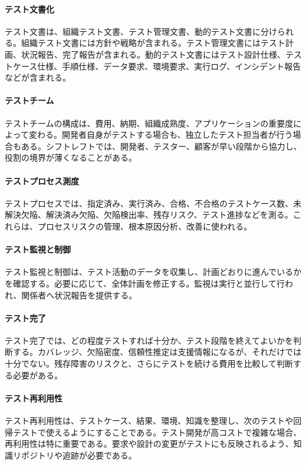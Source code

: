 \paragraph{テスト文書化}
テスト文書は、組織テスト文書、テスト管理文書、動的テスト文書に分けられる。組織テスト文書には方針や戦略が含まれる。テスト管理文書にはテスト計画、状況報告、完了報告が含まれる。動的テスト文書にはテスト設計仕様、テストケース仕様、手順仕様、データ要求、環境要求、実行ログ、インシデント報告などが含まれる。

\paragraph{テストチーム}
テストチームの構成は、費用、納期、組織成熟度、アプリケーションの重要度によって変わる。開発者自身がテストする場合も、独立したテスト担当者が行う場合もある。シフトレフトでは、開発者、テスター、顧客が早い段階から協力し、役割の境界が薄くなることがある。

\paragraph{テストプロセス測度}
テストプロセスでは、指定済み、実行済み、合格、不合格のテストケース数、未解決欠陥、解決済み欠陥、欠陥検出率、残存リスク、テスト進捗などを測る。これらは、プロセスリスクの管理、根本原因分析、改善に使われる。

\paragraph{テスト監視と制御}
テスト監視と制御は、テスト活動のデータを収集し、計画どおりに進んでいるかを確認する。必要に応じて、全体計画を修正する。監視は実行と並行して行われ、関係者へ状況報告を提供する。

\paragraph{テスト完了}
テスト完了では、どの程度テストすれば十分か、テスト段階を終えてよいかを判断する。カバレッジ、欠陥密度、信頼性推定は支援情報になるが、それだけでは十分でない。残存障害のリスクと、さらにテストを続ける費用を比較して判断する必要がある。

\paragraph{テスト再利用性}
テスト再利用性は、テストケース、結果、環境、知識を整理し、次のテストや回帰テストで使えるようにすることである。テスト開発が高コストで複雑な場合、再利用性は特に重要である。要求や設計の変更がテストにも反映されるよう、知識リポジトリや追跡が必要である。

